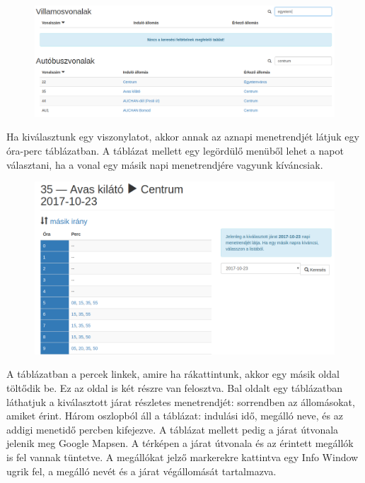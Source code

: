 \begin{figure}[h!]
\centering
\includegraphics[scale=0.32]{kepek/vonalak_tablazat.png}
\caption{}
\label{fig:vonalak_tablazat}
\end{figure}

Ha kiválasztunk egy viszonylatot, akkor annak az aznapi menetrendjét látjuk egy óra-perc táblázatban. A táblázat mellett egy legördülő menüből lehet a napot választani, ha a vonal egy másik napi menetrendjére vagyunk kíváncsiak.

\begin{figure}[h!]
\centering
\includegraphics[scale=0.4]{kepek/menetrend.png}
\caption{}
\label{fig:menetrend}
\end{figure}

A táblázatban a percek linkek, amire ha rákattintunk, akkor egy másik oldal töltődik be. Ez az oldal is két részre van felosztva. Bal oldalt egy táblázatban láthatjuk a kiválasztott járat részletes menetrendjét: sorrendben az állomásokat, amiket érint. Három oszlopból áll a táblázat: indulási idő, megálló neve, és az addigi menetidő percben kifejezve. A táblázat mellett pedig a járat útvonala jelenik meg Google Mapsen. A térképen a járat útvonala és az érintett megállók is fel vannak tüntetve. A megállókat jelző markerekre kattintva egy Info Window ugrik fel, a megálló nevét és a járat végállomását tartalmazva.

